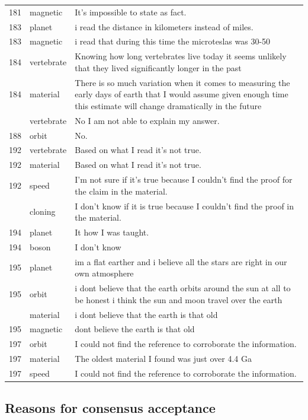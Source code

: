 \documentclass[
  doc,floatsintext]{apa6}
\begin{document}
\begin{longtable}[t]{>{}r>{}l>{\raggedright\arraybackslash}p{30em}}
181 & magnetic & It's impossible to state as fact.\\
183 & planet & i read the distance in kilometers instead of miles.\\
183 & magnetic & i read that during this time the microteslas was 30-50\\
184 & vertebrate & Knowing how long vertebrates live today it seems unlikely that they lived significantly longer in the past\\
184 & material & There is so much variation when it comes to measuring the early days of earth that I would assume given enough time this estimate will change dramatically in the future\\
\addlinespace
188 & vertebrate & No I am not able to explain my answer.\\
188 & orbit & No.\\
192 & vertebrate & Based on what I read it’s not true.\\
192 & material & Based on what I read it’s not true.\\
192 & speed & I’m not sure if it’s true because I couldn’t find the proof for the claim in the material.\\
\addlinespace
192 & cloning & I don’t know if it is true because I couldn’t find the proof in the material.\\
194 & planet & It how I was taught.\\
194 & boson & I don't know\\
195 & planet & im a flat earther and i believe all the stars are right in our own atmosphere\\
195 & orbit & i dont believe that the earth orbits around the sun at all to be honest i think the sun and moon travel over the earth\\
\addlinespace
195 & material & i dont believe that the earth is that old\\
195 & magnetic & dont believe the earth is that old\\
197 & orbit & I could not find the reference to corroborate the information.\\
197 & material & The oldest material I found was just over 4.4 Ga\\
197 & speed & I could not find the reference to corroborate the information.\\
\bottomrule
\end{longtable}

\subsection{Reasons for consensus acceptance}\label{reasons-for-consensus-acceptance-1}
\end{document}

